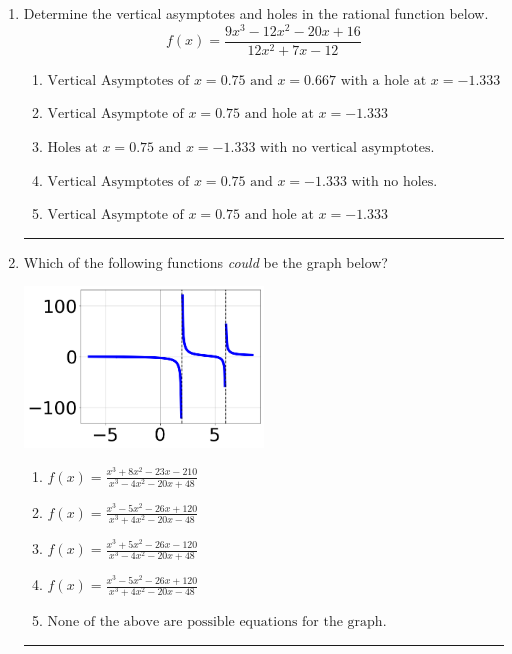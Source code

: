 \documentclass[14pt]{extbook}
\newcommand{\litem}[1]{\item#1\hspace*{-1cm}\rule{\textwidth}{0.4pt}}
\begin{document}
\begin{enumerate}
{\begin{enumerate}[label=\Alph*.]
\end{enumerate} }
\litem{
Determine the vertical asymptotes and holes in the rational function below.\[ f(x) = \frac{9x^{3} -12 x^{2} -20 x + 16}{12x^{2} +7 x -12} \]\begin{enumerate}[label=\Alph*.]
\item \( \text{Vertical Asymptotes of } x = 0.75 \text{ and } x = 0.667 \text{ with a hole at } x = -1.333 \)
\item \( \text{Vertical Asymptote of } x = 0.75 \text{ and hole at } x = -1.333 \)
\item \( \text{Holes at } x = 0.75 \text{ and } x = -1.333 \text{ with no vertical asymptotes.} \)
\item \( \text{Vertical Asymptotes of } x = 0.75 \text{ and } x = -1.333 \text{ with no holes.} \)
\item \( \text{Vertical Asymptote of } x = 0.75 \text{ and hole at } x = -1.333 \)

\end{enumerate} }
\litem{
Which of the following functions \textit{could} be the graph below?
\begin{center}
    \includegraphics[width=0.5\textwidth]{../Figures/identifyGraphOfRationalFunctionCopyB.png}
\end{center}
\begin{enumerate}[label=\Alph*.]
\item \( f(x)=\frac{x^{3} +8 x^{2} -23 x -210}{x^{3} -4 x^{2} -20 x + 48} \)
\item \( f(x)=\frac{x^{3} -5 x^{2} -26 x + 120}{x^{3} +4 x^{2} -20 x -48} \)
\item \( f(x)=\frac{x^{3} +5 x^{2} -26 x -120}{x^{3} -4 x^{2} -20 x + 48} \)
\item \( f(x)=\frac{x^{3} -5 x^{2} -26 x + 120}{x^{3} +4 x^{2} -20 x -48} \)
\item \( \text{None of the above are possible equations for the graph.} \)

\end{enumerate} }
\end{enumerate}
\end{document}

